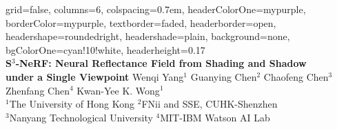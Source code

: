 \documentclass[landscape,a0paper,fontscale=0.292]{baposter}
\begin{document}
\begin{poster}{
    grid=false,
    columns=6,
    colspacing=0.7em,
    headerColorOne=mypurple,
    borderColor=mypurple,
    textborder=faded,
    headerborder=open,
    headershape=roundedright,
    headershade=plain,
    background=none,
    bgColorOne=cyan!10!white,
    headerheight=0.17\textheight
}
{
    \makebox[0.005\textwidth]{} 
    \makebox[0.005\textwidth]{} 
    \makebox[0.005\textwidth]{} 
}
{
    \\[0.3em]\sc\huge\bf \textcolor{ctitle}{\Huge{S$^3$-NeRF}}: Neural Reflectance Field from \textcolor{ctitle}{\Huge{S}}hading and \textcolor{ctitle}{\Huge{S}}hadow\\[0.15em] under a \textcolor{ctitle}{\Huge{S}}ingle Viewpoint
}
{
    \vspace{0.3em} Wenqi Yang$^1$ \enspace Guanying Chen$^2$ \enspace Chaofeng Chen$^3$ \enspace Zhenfang Chen$^4$ \enspace Kwan-Yee K. Wong$^1$ \\[0.2em]
    {$^1$The University of Hong Kong \enspace$^2$FNii and SSE, CUHK-Shenzhen \\[0.1em] $^3$Nanyang Technological University \enspace$^4$MIT-IBM Watson AI Lab}
}
{
    \begin{tabular}{c}

\end{tabular}}
\end{poster}
\end{document}
